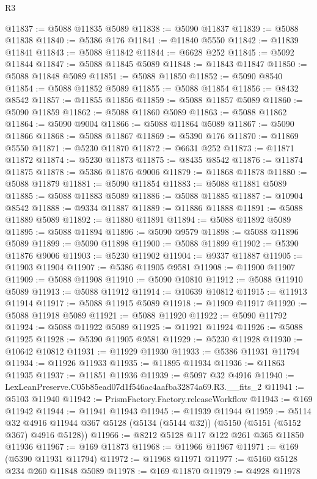 \begin{lexlean}{R3}
\begin{coremodule}
@11837 := @5088 @11835 @5089
@11838 := @5090 @11837
@11839 := @5088 @11838
@11840 := @5386 @176
@11841 := @11840 @5550
@11842 := @11839 @11841
@11843 := @5088 @11842
@11844 := @6628 @252
@11845 := @5092 @11844
@11847 := @5088 @11845 @5089
@11848 := @11843 @11847
@11850 := @5088 @11848 @5089
@11851 := @5088 @11850
@11852 := @5090 @8540
@11854 := @5088 @11852 @5089
@11855 := @5088 @11854
@11856 := @8432 @8542
@11857 := @11855 @11856
@11859 := @5088 @11857 @5089
@11860 := @5090 @11859
@11862 := @5088 @11860 @5089
@11863 := @5088 @11862
@11864 := @5090 @9004
@11866 := @5088 @11864 @5089
@11867 := @5090 @11866
@11868 := @5088 @11867
@11869 := @5390 @176
@11870 := @11869 @5550
@11871 := @5230 @11870
@11872 := @6631 @252
@11873 := @11871 @11872
@11874 := @5230 @11873
@11875 := @8435 @8542
@11876 := @11874 @11875
@11878 := @5386 @11876 @9006
@11879 := @11868 @11878
@11880 := @5088 @11879
@11881 := @5090 @11854
@11883 := @5088 @11881 @5089
@11885 := @5088 @11883 @5089
@11886 := @5088 @11885
@11887 := @10904 @8542
@11888 := @9334 @11887
@11889 := @11886 @11888
@11891 := @5088 @11889 @5089
@11892 := @11880 @11891
@11894 := @5088 @11892 @5089
@11895 := @5088 @11894
@11896 := @5090 @9579
@11898 := @5088 @11896 @5089
@11899 := @5090 @11898
@11900 := @5088 @11899
@11902 := @5390 @11876 @9006
@11903 := @5230 @11902
@11904 := @9337 @11887
@11905 := @11903 @11904
@11907 := @5386 @11905 @9581
@11908 := @11900 @11907
@11909 := @5088 @11908
@11910 := @5090 @10810
@11912 := @5088 @11910 @5089
@11913 := @5088 @11912
@11914 := @10639 @10812
@11915 := @11913 @11914
@11917 := @5088 @11915 @5089
@11918 := @11909 @11917
@11920 := @5088 @11918 @5089
@11921 := @5088 @11920
@11922 := @5090 @11792
@11924 := @5088 @11922 @5089
@11925 := @11921 @11924
@11926 := @5088 @11925
@11928 := @5390 @11905 @9581
@11929 := @5230 @11928
@11930 := @10642 @10812
@11931 := @11929 @11930
@11933 := @5386 @11931 @11794
@11934 := @11926 @11933
@11935 := @11895 @11934
@11936 := @11863 @11935
@11937 := @11851 @11936
@11939 := @5097 @32 @4916
@11940 := LexLeanPreserve.C05b85ead07d1f546ac4aafba32874a69.R3.__fits_2
@11941 := @5103 @11940
@11942 := PrismFactory.Factory.releaseWorkflow
@11943 := @169 @11942
@11944 := @11941 @11943
@11945 := @11939 @11944
@11959 := @5114
    @32
    @4916
    @11944
    @367
    @5128
    (@5134 (@5144 @32))
    (@5150 (@5151 (@5152 @367) @4916 @5128))
@11966 := @8212 @5128 @117 @122 @261 @365 @11850 @11936
@11967 := @169 @11873
@11968 := @11966 @11967
@11971 := @169 (@5390 @11931 @11794)
@11972 := @11968 @11971
@11977 := @5160 @5128 @234 @260 @11848 @5089
@11978 := @169 @11870
@11979 := @4928 @11978

\end{coremodule}
\end{lexlean}
